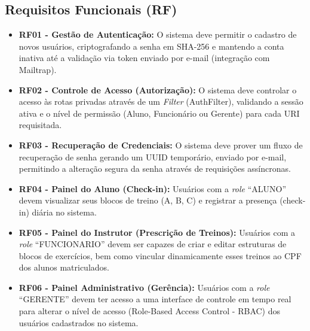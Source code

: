 \documentclass[12pt, a4paper]{article}
\begin{document}
\subsection{Requisitos Funcionais (RF)}
\begin{itemize}
    \item \textbf{RF01 - Gestão de Autenticação:} O sistema deve permitir o cadastro de novos usuários, criptografando a senha em SHA-256 e mantendo a conta inativa até a validação via token enviado por e-mail (integração com Mailtrap).
    \item \textbf{RF02 - Controle de Acesso (Autorização):} O sistema deve controlar o acesso às rotas privadas através de um \textit{Filter} (AuthFilter), validando a sessão ativa e o nível de permissão (Aluno, Funcionário ou Gerente) para cada URI requisitada.
    \item \textbf{RF03 - Recuperação de Credenciais:} O sistema deve prover um fluxo de recuperação de senha gerando um UUID temporário, enviado por e-mail, permitindo a alteração segura da senha através de requisições assíncronas.
    \item \textbf{RF04 - Painel do Aluno (Check-in):} Usuários com a \textit{role} ``ALUNO'' devem visualizar seus blocos de treino (A, B, C) e registrar a presença (check-in) diária no sistema.
    \item \textbf{RF05 - Painel do Instrutor (Prescrição de Treinos):} Usuários com a \textit{role} ``FUNCIONARIO'' devem ser capazes de criar e editar estruturas de blocos de exercícios, bem como vincular dinamicamente esses treinos ao CPF dos alunos matriculados.
    \item \textbf{RF06 - Painel Administrativo (Gerência):} Usuários com a \textit{role} ``GERENTE'' devem ter acesso a uma interface de controle em tempo real para alterar o nível de acesso (Role-Based Access Control - RBAC) dos usuários cadastrados no sistema.
\end{itemize}
\end{document}
